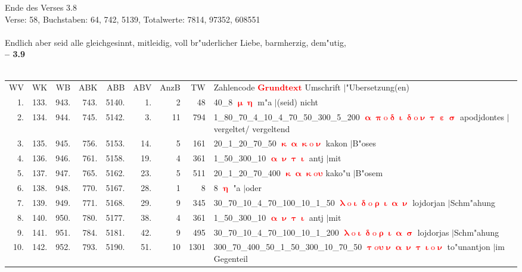 \documentclass[a4paper,10pt,landscape]{article}
\begin{document}
Ende des Verses 3.8\\
Verse: 58, Buchstaben: 64, 742, 5139, Totalwerte: 7814, 97352, 608551\\
\\
Endlich aber seid alle gleichgesinnt, mitleidig, voll br"uderlicher Liebe, barmherzig, dem"utig,\\
\newpage 
{\bf -- 3.9}\\
\medskip \\
\begin{tabular}{rrrrrrrrp{120mm}}
WV&WK&WB&ABK&ABB&ABV&AnzB&TW&Zahlencode \textcolor{red}{$\boldsymbol{Grundtext}$} Umschrift $|$"Ubersetzung(en)\\
1.&133.&943.&743.&5140.&1.&2&48&40\_8 \textcolor{red}{$\boldsymbol{\upmu\upeta}$} m"a $|$(seid) nicht\\
2.&134.&944.&745.&5142.&3.&11&794&1\_80\_70\_4\_10\_4\_70\_50\_300\_5\_200 \textcolor{red}{$\boldsymbol{\upalpha\uppi\mathrm{o}\updelta\upiota\updelta\mathrm{o}\upnu\uptau\upepsilon\upsigma}$} apodjdontes $|$vergeltet/ vergeltend\\
3.&135.&945.&756.&5153.&14.&5&161&20\_1\_20\_70\_50 \textcolor{red}{$\boldsymbol{\upkappa\upalpha\upkappa\mathrm{o}\upnu}$} kakon $|$B"oses\\
4.&136.&946.&761.&5158.&19.&4&361&1\_50\_300\_10 \textcolor{red}{$\boldsymbol{\upalpha\upnu\uptau\upiota}$} antj $|$mit\\
5.&137.&947.&765.&5162.&23.&5&511&20\_1\_20\_70\_400 \textcolor{red}{$\boldsymbol{\upkappa\upalpha\upkappa\mathrm{o}\upsilon}$} kako"u $|$B"osem\\
6.&138.&948.&770.&5167.&28.&1&8&8 \textcolor{red}{$\boldsymbol{\upeta}$} "a $|$oder\\
7.&139.&949.&771.&5168.&29.&9&345&30\_70\_10\_4\_70\_100\_10\_1\_50 \textcolor{red}{$\boldsymbol{\uplambda\mathrm{o}\upiota\updelta\mathrm{o}\uprho\upiota\upalpha\upnu}$} lojdorjan $|$Schm"ahung\\
8.&140.&950.&780.&5177.&38.&4&361&1\_50\_300\_10 \textcolor{red}{$\boldsymbol{\upalpha\upnu\uptau\upiota}$} antj $|$mit\\
9.&141.&951.&784.&5181.&42.&9&495&30\_70\_10\_4\_70\_100\_10\_1\_200 \textcolor{red}{$\boldsymbol{\uplambda\mathrm{o}\upiota\updelta\mathrm{o}\uprho\upiota\upalpha\upsigma}$} lojdorjas $|$Schm"ahung\\
10.&142.&952.&793.&5190.&51.&10&1301&300\_70\_400\_50\_1\_50\_300\_10\_70\_50 \textcolor{red}{$\boldsymbol{\uptau\mathrm{o}\upsilon\upnu\upalpha\upnu\uptau\upiota\mathrm{o}\upnu}$} to"unantjon $|$im Gegenteil\\

\end{tabular}
\end{document}

